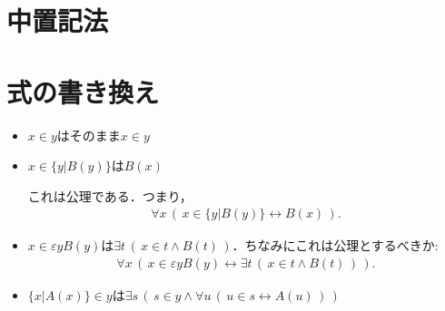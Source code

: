 \documentclass[a4j,10.5pt,oneside,openany]{jsbook}
\theoremstyle{mystyle}
\begin{document}
\section{中置記法}
	
	
\section{式の書き換え}
	\begin{itemize}
		\item $x \in y$はそのまま$x \in y$
		\item $x \in \{y|B(y)\}$は$B(x)$
			
			これは公理である．つまり，
			\begin{align}
				\forall x\, \left(\, x \in \{y|B(y)\} \leftrightarrow B(x)\, \right).
			\end{align}
			
		\item $x \in \varepsilon y B(y)$は$\exists t\, \left(\, x \in t \wedge B(t)\, \right)$．ちなみにこれは公理とするべきか:
			\begin{align}
				\forall x\, \left(\, x \in \varepsilon y B(y) \leftrightarrow
				\exists t\, \left(\, x \in t \wedge B(t)\, \right)\, \right).
			\end{align}
			
		\item $\{x|A(x)\} \in y$は$\exists s\, \left(\, s \in y \wedge 
			\forall u\, \left(\, u \in s \leftrightarrow A(u)\, \right)\, \right)$
			

\end{itemize}
\end{document}
